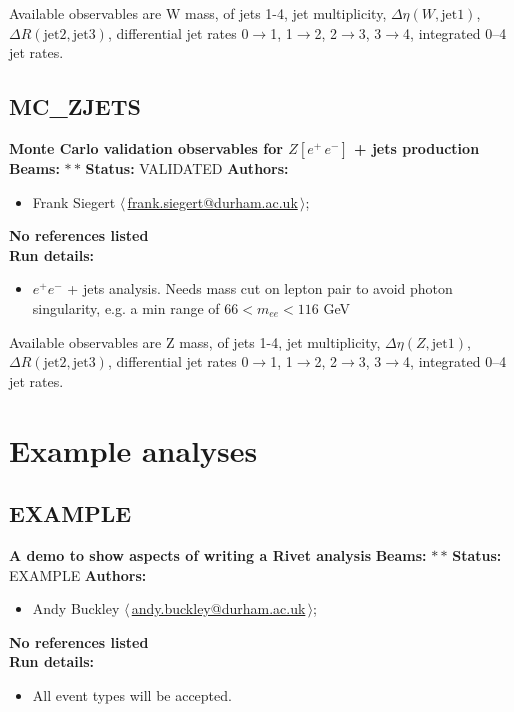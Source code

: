 \noindent Available observables are W mass, \pT of jets 1-4, jet multiplicity, $\Delta\eta(W, \text{jet1})$, $\Delta R(\text{jet2}, \text{jet3})$, differential jet rates 0\ensuremath{\to}1, 1\ensuremath{\to}2, 2\ensuremath{\to}3, 3\ensuremath{\to}4, integrated 0--4 jet rates.

\clearpage


\clearpage

\subsection{MC\_ZJETS}
\textbf{Monte Carlo validation observables for $Z[e^+ \, e^-]$ + jets production}\newline
\textbf{Beams:} $*$\,$*$ \newline
\textbf{Status:} VALIDATED\newline
\textbf{Authors:}
\begin{itemize}
  \item Frank Siegert $\langle\,$\href{mailto:frank.siegert@durham.ac.uk}{frank.siegert@durham.ac.uk}$\,\rangle$;
\end{itemize}
\textbf{No references listed}\\ 
\textbf{Run details:}
\begin{itemize}

  \item $e^+ e^-$ + jets analysis. Needs mass cut on lepton pair to avoid photon singularity, e.g. a min range of $66 < m_{ee} < 116$ GeV\end{itemize}

\noindent Available observables are Z mass, \pT of jets 1-4, jet multiplicity, $\Delta\eta(Z, \text{jet1})$, $\Delta R(\text{jet2}, \text{jet3})$, differential jet rates 0\ensuremath{\to}1, 1\ensuremath{\to}2, 2\ensuremath{\to}3, 3\ensuremath{\to}4, integrated 0--4 jet rates.

\clearpage


\section{Example analyses}\subsection{EXAMPLE}
\textbf{A demo to show aspects of writing a Rivet analysis}\newline
\textbf{Beams:} $*$\,$*$ \newline
\textbf{Status:} EXAMPLE\newline
\textbf{Authors:}
\begin{itemize}
  \item Andy Buckley $\langle\,$\href{mailto:andy.buckley@durham.ac.uk}{andy.buckley@durham.ac.uk}$\,\rangle$;
\end{itemize}
\textbf{No references listed}\\ 
\textbf{Run details:}
\begin{itemize}

  \item All event types will be accepted.\end{itemize}

